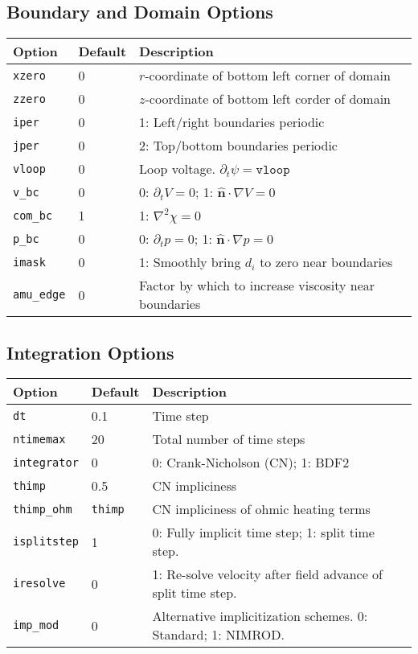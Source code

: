 \documentclass[draft]{book}
\renewcommand{\vec}[1]{\ensuremath{\mathbf{#1}}}
\newcommand{\grad}[1]{\nabla #1}
\newcommand{\uvec}[1]{\ensuremath{\vec{\hat{#1}}}}
\newcommand{\n}{\ensuremath{\uvec{n}}}
\begin{document}
\subsection{Boundary and Domain Options}

\begin{tabular}{lll}
  \textbf{Option} & \textbf{Default} & \textbf{Description}\\
  \hline
  \texttt{xzero}  & 0 & $r$-coordinate of bottom left corner of domain\\
  \texttt{zzero}  & 0 & $z$-coordinate of bottom left corder of domain\\
  \texttt{iper}   & 0 & 1: Left/right boundaries periodic\\
  \texttt{jper}   & 0 & 2: Top/bottom boundaries periodic\\
  \texttt{vloop}  & 0 & Loop voltage.  $\partial_t \psi = \mathtt{vloop}$\\
  \texttt{v\_bc}  & 0 & 0: $\partial_t V = 0$; 1: $\n \cdot \grad{V} = 0$\\
  \texttt{com\_bc}& 1 & 1: $\nabla^2 \chi = 0$\\
  \texttt{p\_bc}  & 0 & 0: $\partial_t p = 0$; 1: $\n \cdot \grad{p} =
    0$\\
  \texttt{imask}  & 0 & 1: Smoothly bring $d_i$ to zero near
    boundaries\\
  \texttt{amu\_edge}&0& \parbox[t]{2.5in}{Factor by which to
    increase viscosity near boundaries}\\
\end{tabular}


\subsection{Integration Options}
\begin{tabular}{llll}
  \textbf{Option}&\textbf{Default}&\textbf{Description}\\
  \hline
  \texttt{dt}         & 0.1 & Time step\\
  \texttt{ntimemax}   & 20  & Total number of time steps\\
  \texttt{integrator} & 0   & 0: Crank-Nicholson (CN); 1: BDF2\\
  \texttt{thimp}      & 0.5 & CN impliciness\\
  \texttt{thimp\_ohm} & \texttt{thimp} & 
                              CN impliciness of ohmic heating terms\\
  \texttt{isplitstep} & 1   & 0: Fully implicit time step; 
                              1: split time step.\\
  \texttt{iresolve}   & 0   & \parbox[t]{3in}{1: Re-solve velocity after 
                              field advance of split time step.}\\
  \texttt{imp\_mod}   & 0   & \parbox[t]{3in}{Alternative implicitization
    schemes. 0: Standard; 1: NIMROD.}
\end{tabular}
\end{document}
